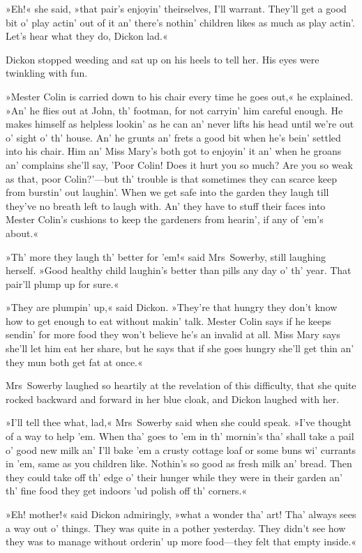 »Eh!« she said, »that pair's enjoyin' theirselves, I'll warrant. They'll get a good bit o' play actin' out of it an' there's nothin' children likes as much as play actin'. Let's hear what they do, Dickon lad.«

Dickon stopped weeding and sat up on his heels to tell her. His eyes were twinkling with fun.

»Mester Colin is carried down to his chair every time he goes out,« he explained. »An' he flies out at John, th' footman, for not carryin' him careful enough. He makes himself as helpless lookin' as he can an' never lifts his head until we're out o' sight o' th' house. An' he grunts an' frets a good bit when he's bein' settled into his chair. Him an' Miss Mary's both got to enjoyin' it an' when he groans an' complains she'll say, 'Poor Colin! Does it hurt you so much? Are you so weak as that, poor Colin?'—but th' trouble is that sometimes they can scarce keep from burstin' out laughin'. When we get safe into the garden they laugh till they've no breath left to laugh with. An' they have to stuff their faces into Mester Colin's cushions to keep the gardeners from hearin', if any of 'em's about.«

»Th' more they laugh th' better for 'em!« said Mrs~Sowerby, still laughing herself. »Good healthy child laughin's better than pills any day o' th' year. That pair'll plump up for sure.«

»They are plumpin' up,« said Dickon. »They're that hungry they don't know how to get enough to eat without makin' talk. Mester Colin says if he keeps sendin' for more food they won't believe he's an invalid at all. Miss Mary says she'll let him eat her share, but he says that if she goes hungry she'll get thin an' they mun both get fat at once.«

Mrs~Sowerby laughed so heartily at the revelation of this difficulty, that she quite rocked backward and forward in her blue cloak, and Dickon laughed with her.

»I'll tell thee what, lad,« Mrs~Sowerby said when she could speak. »I've thought of a way to help 'em. When tha' goes to 'em in th' mornin's tha' shall take a pail o' good new milk an' I'll bake 'em a crusty cottage loaf or some buns wi' currants in 'em, same as you children like. Nothin's so good as fresh milk an' bread. Then they could take off th' edge o' their hunger while they were in their garden an' th' fine food they get indoors 'ud polish off th' corners.«

»Eh! mother!« said Dickon admiringly, »what a wonder tha' art! Tha' always sees a way out o' things. They was quite in a pother yesterday. They didn't see how they was to manage without orderin' up more food—they felt that empty inside.«

